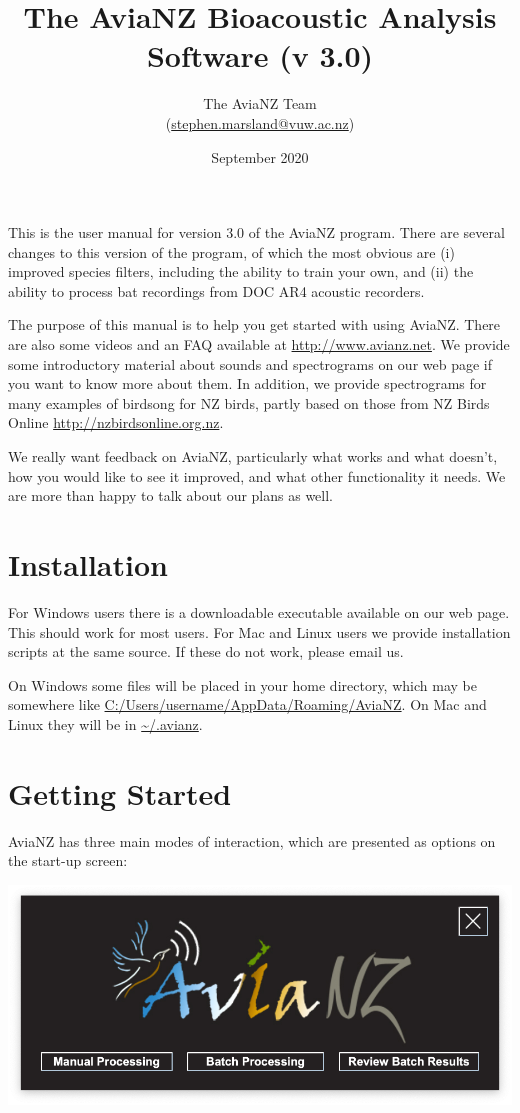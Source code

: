 \documentclass{article}
\title{The AviaNZ Bioacoustic Analysis Software (v 3.0)}
\author{The AviaNZ Team \\(\url{stephen.marsland@vuw.ac.nz})}
\date{September 2020}
\begin{document}
\maketitle

This is the user manual for version 3.0 of the AviaNZ program. There are several changes to this version of the program, of which the most obvious are (i) improved species filters, including the ability to train your own, and (ii) the ability to process bat recordings from DOC AR4 acoustic recorders. 

The purpose of this manual is to help you get started with using AviaNZ. There are also some videos and an FAQ available at \url{http://www.avianz.net}. We provide some introductory material about sounds and spectrograms on our web page if you want to know more about them. In addition, we provide spectrograms for many examples of birdsong for NZ birds, partly based on those from NZ Birds Online \url{http://nzbirdsonline.org.nz}.
 
We really want feedback on AviaNZ, particularly what works and what doesn't, how you would like to see it improved, and what other functionality it needs. We are more than happy to talk about our plans as well. 

\tableofcontents

\newpage
\section{Installation}

For Windows users there is a downloadable executable available on our web page. This should work for most users. For Mac and Linux users we provide installation scripts at the same source. If these do not work, please email us.

On Windows some files will be placed in your home directory, which may be somewhere like \url{C:/Users/username/AppData/Roaming/AviaNZ}. On Mac and Linux they will be in \url{~/.avianz}. 

\section{Getting Started}

AviaNZ has three main modes of interaction, which are presented as options on the start-up screen:

\begin{center}
\includegraphics[width=.3\textwidth]{Figures/Splashscreen}
\end{center}
\end{document}
